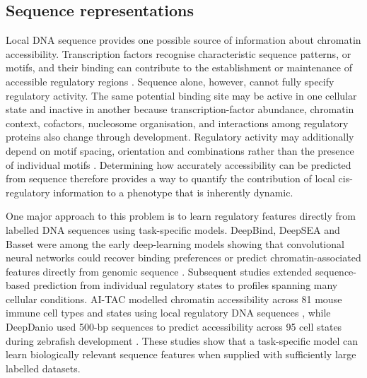 \documentclass[a4paper,12pt]{article}
\begin{document}
\subsection{Sequence representations}

Local DNA sequence provides one possible source of information about chromatin accessibility. Transcription factors recognise characteristic sequence patterns, or motifs, and their binding can contribute to the establishment or maintenance of accessible regulatory regions \citep{vorontsov2024hocomoco,pampari2025chrombpnet}. Sequence alone, however, cannot fully specify regulatory activity. The same potential binding site may be active in one cellular state and inactive in another because transcription-factor abundance, chromatin context, cofactors, nucleosome organisation, and interactions among regulatory proteins also change through development. Regulatory activity may additionally depend on motif spacing, orientation and combinations rather than the presence of individual motifs \citep{jolma2015tfpairs,avsec2021bpnet}. Determining how accurately accessibility can be predicted from sequence therefore provides a way to quantify the contribution of local cis-regulatory information to a phenotype that is inherently dynamic.

One major approach to this problem is to learn regulatory features directly from labelled DNA sequences using task-specific models. DeepBind, DeepSEA and Basset were among the early deep-learning models showing that convolutional neural networks could recover binding preferences or predict chromatin-associated features directly from genomic sequence \citep{alipanahi2015deepbind,zhou2015deepsea,kelley2016basset}. Subsequent studies extended sequence-based prediction from individual regulatory states to profiles spanning many cellular conditions. AI-TAC modelled chromatin accessibility across 81 mouse immune cell types and states using local regulatory DNA sequences \citep{maslova2020aitac}, while DeepDanio used 500-bp sequences to predict accessibility across 95 cell states during zebrafish development \citep{liu2024deepdanio}. These studies show that a task-specific model can learn biologically relevant sequence features when supplied with sufficiently large labelled datasets.
\end{document}
